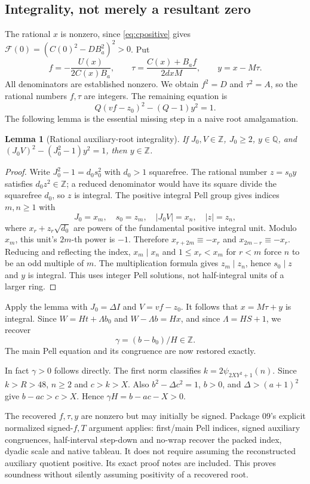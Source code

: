 \documentclass[11 pt]{article}
\newtheorem{lemma}{Lemma}
\begin{document}
\subsection{Integrality, not merely a resultant zero}
The rational $ x $ is nonzero, since \eqref{eq:cpositive} gives
$\mathcal F(0)=(C(0)^2-DB_a^2)^2>0 $. Put
\[
f=-\frac{U(x)}{2 C(x)B_a},\qquad
\tau=\frac{C(x)+B_af}{2 dxM},\qquad y=x-M\tau.
\]
All denominators are established nonzero. We obtain $ f^2=D $ and $\tau^2=A $, so the rational numbers $ f,\tau $ are integers. The remaining equation is
\[
Q(vf-z_0)^2-(Q-1)y^2=1.
\]
The following lemma is the essential missing step in a naive root amalgamation.

\begin{lemma}[Rational auxiliary-root integrality]\label{lem:rational}
If $ J_0,V\in\mathbb Z $, $ J_0\ge 2 $, $ y\in\mathbb Q $, and
$(J_0 V)^2-(J_0^2-1)y^2=1 $, then $ y\in\mathbb Z $.
\end{lemma}
\begin{proof}
Write $ J_0^2-1=d_0 s_0^2 $ with $ d_0>1 $ squarefree. The rational number $ z=s_0 y $ satisfies $ d_0 z^2\in\mathbb Z $; a reduced denominator would have its square divide the squarefree $ d_0 $, so $ z $ is integral. The positive integral Pell group gives indices $ m,n\ge 1 $ with
\[
J_0=x_m,\quad s_0=z_m,\quad |J_0 V|=x_n,\quad |z|=z_n,
\]
where $ x_r+z_r\sqrt{d_0}$ are powers of the fundamental positive integral unit. Modulo $ x_m $, this unit's $2m$-th power is $-1 $. Therefore
$ x_{r+2 m}\equiv-x_r $ and $ x_{2 m-r}\equiv-x_r $.
Reducing and reflecting the index, $ x_m\mid x_n $ and
$ 1\le x_r<x_m $ for $ r<m $ force $ n $ to be an odd multiple of $ m $.
The multiplication formula gives $ z_m\mid z_n $, hence $ s_0\mid z $ and $ y $ is integral. This uses integer Pell solutions, not half-integral units of a larger ring.
\end{proof}
Apply the lemma with $ J_0=\Delta I $ and $ V=vf-z_0 $. It follows that $ x=M\tau+y $ is integral. Since
$ W=Ht+\Lambda b_0 $ and $ W-\Lambda b=Hx $, and since $\Lambda=HS+1 $, we recover
\[
\gamma=(b-b_0)/H\in\mathbb Z.
\]
The main Pell equation and its congruence are now restored exactly.

In fact $\gamma>0 $ follows directly. The first norm classifies
$ k=2\psi_{2 XY^2+1}(n)$. Since $ k>R>48 $, $ n\ge 2 $ and $ c>k>X $.
Also $ b^2-\Delta c^2=1 $, $ b>0 $, and $\Delta>(a+1)^2 $ give
$ b-ac>c>X $. Hence $\gamma H=b-ac-X>0 $.

The recovered $ f,\tau,y $ are nonzero but may initially be signed. Package 09's explicit normalized signed-$ f,T $ argument applies: first/main Pell indices, signed auxiliary congruences, half-interval step-down and no-wrap recover the packed index, dyadic scale and native tableau. It does not require assuming the reconstructed auxiliary quotient positive. Its exact proof notes are included. This proves soundness without silently assuming positivity of a recovered root.
\end{document}
